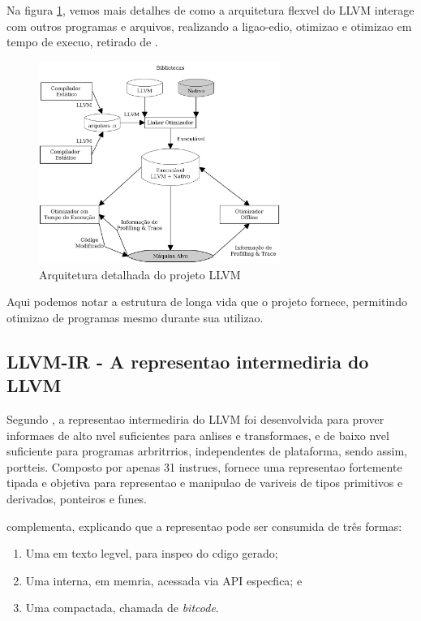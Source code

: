 Na figura \ref{fig:llvmarch2}, vemos mais detalhes de como a arquitetura flex\ih vel do LLVM interage com outros programas e arquivos, realizando a liga\ca o-edi\ca o, otimiza\ca o e otimiza\ca o em tempo de execu\ca o, retirado de \cite{Machado07}.

\begin{figure}[htp]
  \begin{center}
    \includegraphics[width=0.7\textwidth]{figuras/llvmarch2}
  \end{center}
  \caption{Arquitetura detalhada do projeto LLVM}
  \label{fig:llvmarch2}
\end{figure}

Aqui podemos notar a estrutura de longa vida que o projeto fornece, permitindo otimiza\ca o de programas mesmo durante sua utiliza\ca o.

\subsection{LLVM-IR - A representa\ca o intermedi\ah ria do LLVM}
\label{llvm:llvm-ir}

Segundo \cite{Cantu08:1}, a representa\ca o intermedi\ah ria do LLVM foi desenvolvida para prover informa\co es de alto n\ih vel suficientes para an\ah lises e transforma\co es, e de baixo n\ih vel suficiente para programas arbritr\ah rios, independentes de plataforma, sendo assim, port\ah teis. Composto por apenas 31 instru\co es, fornece uma representa\ca o fortemente tipada e objetiva para representa\ca o e manipula\ca o de vari\ah veis de tipos primitivos e derivados, ponteiros e fun\co es.

\cite{Machado07} complementa, explicando que a representa\ca o pode ser consumida de tr\^es formas:

\begin{enumerate}
\item Uma em texto leg\ih vel, para inspe\ca o do c\oh digo gerado;
\item Uma interna, em mem\oh ria, acessada via API espec\ih fica; e
\item Uma compactada, chamada de \emph{bitcode}.
\end{enumerate}

